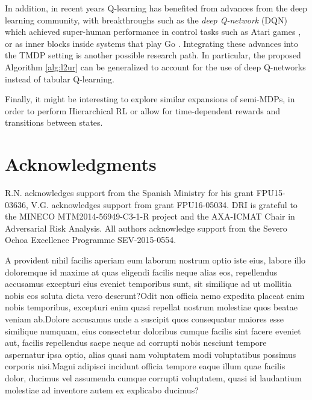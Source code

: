 \documentclass[letterpaper]{article} %
\begin{document}
In addition, in recent years Q-learning has benefited from advances from the deep learning community, with breakthroughs such as the \emph{deep Q-network} (DQN) which achieved super-human performance in control tasks such as Atari games \cite{mnih2015human}, or as inner blocks inside systems that play Go \cite{silver2017mastering}. Integrating these advances into the TMDP setting is another possible research path. In particular, the proposed Algorithm \ref{alg:l2ur} can be
generalized to account for the use of deep Q-networks instead of tabular Q-learning.

Finally, it might be interesting to explore similar expansions of semi-MDPs, in order to perform Hierarchical RL or allow for time-dependent rewards and transitions between states.






 \section{ Acknowledgments}

 R.N. acknowledges support from the Spanish Ministry for his grant FPU15-03636, V.G. acknowledges support from grant FPU16-05034. DRI is grateful to the MINECO MTM2014-56949-C3-1-R project and the AXA-ICMAT Chair in Adversarial Risk Analysis. All authors acknowledge support from the Severo Ochoa Excellence Programme SEV-2015-0554.


{
\normalsize
A provident nihil facilis aperiam eum laborum nostrum optio iste eius, labore illo doloremque id maxime at quas eligendi facilis neque alias eos, repellendus accusamus excepturi eius eveniet temporibus sunt, sit similique ad ut mollitia nobis eos soluta dicta vero deserunt?Odit non officia nemo expedita placeat enim nobis temporibus, excepturi enim quasi repellat nostrum molestiae quos beatae veniam ab.Dolore accusamus unde a suscipit quos consequatur maiores esse similique numquam, eius consectetur doloribus cumque facilis sint facere eveniet aut, facilis repellendus saepe neque ad corrupti nobis nesciunt tempore aspernatur ipsa optio, alias quasi nam voluptatem modi voluptatibus possimus corporis nisi.Magni adipisci incidunt officia tempore eaque illum quae facilis dolor, ducimus vel assumenda cumque corrupti voluptatem, quasi id laudantium molestiae ad inventore autem ex explicabo ducimus?\clearpage

}
\end{document}
